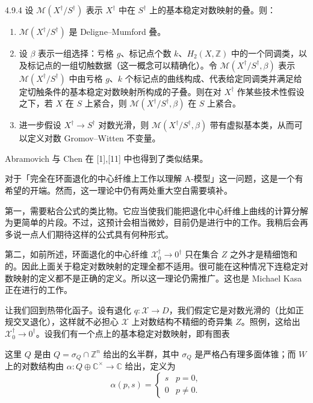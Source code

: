 \begin{theorem}{4.9.4}
设 $\mathcal{M}(X^\dagger/S^\dagger)$ 表示 $X^\dagger$ 中在 $S^\dagger$ 上的基本稳定对数映射的叠。则：
\begin{enumerate}
\item $\mathcal{M}(X^\dagger/S^\dagger)$ 是 Deligne--Mumford 叠。
\item 设 $\beta$ 表示一组选择：亏格 $g$、标记点个数 $k$、$H_2(X,\mathbb{Z})$ 中的一个同调类，以及标记点的一组切触数据（这一概念可以精确化）。令 $\mathcal{M}(X^\dagger/S^\dagger,\beta)$ 表示 $\mathcal{M}(X^\dagger/S^\dagger)$ 中由亏格 $g$、$k$ 个标记点的曲线构成、代表给定同调类并满足给定切触条件的基本稳定对数映射所构成的子叠。则在对 $X^\dagger$ 作某些技术性假设之下，若 $X$ 在 $S$ 上紧合，则 $\mathcal{M}(X^\dagger/S^\dagger,\beta)$ 在 $S$ 上紧合。
\item 进一步假设 $X^\dagger\to S^\dagger$ 对数光滑，则 $\mathcal{M}(X^\dagger/S^\dagger,\beta)$ 带有虚拟基本类，从而可以定义对数 Gromov--Witten 不变量。
\end{enumerate}
\end{theorem}

Abramovich 与 Chen 在 [1],[11] 中也得到了类似结果。

对于「完全在环面退化的中心纤维上工作以理解 A-模型」这一问题，这是一个有希望的开端。然而，这一理论中仍有两处重大空白需要填补。

第一，需要粘合公式的类比物。它应当使我们能把退化中心纤维上曲线的计算分解为更简单的片段。不过，这预计会相当微妙，目前仍是进行中的工作。我稍后会再多说一点人们期待这样的公式具有何种形式。

第二，如前所述，环面退化的中心纤维 $\mathcal{X}_0^\dagger\to 0^\dagger$ 只在集合 $Z$ 之外才是精细饱和的。因此上面关于稳定对数映射的定理全都不适用。很可能在这种情况下连稳定对数映射的定义都不是正确的定义。所以这一理论仍需推广。这也是 Michael Kasa 正在进行的工作。

让我们回到热带化函子。设有退化 $q:\mathcal{X}\to D$，我们假定它是对数光滑的（比如正规交叉退化），这样就不必担心 $\mathcal{X}$ 上对数结构不精细的奇异集 $Z$。照例，这给出 $\mathcal{X}_0^\dagger\to 0^\dagger$。设我们有一个点上的基本稳定对数映射，即有图表
\begin{center}
\end{center}
这里 $Q$ 是由 $Q=\sigma_Q\cap\mathbb{Z}^n$ 给出的幺半群，其中 $\sigma_Q$ 是严格凸有理多面体锥；而 $W$ 上的对数结构由 $\alpha:Q\oplus\mathbb{C}^\times\to\mathbb{C}$ 给出，定义为
\[
\alpha(p,s)=\begin{cases} s & p=0,\\ 0 & p\neq 0.\end{cases}
\]
